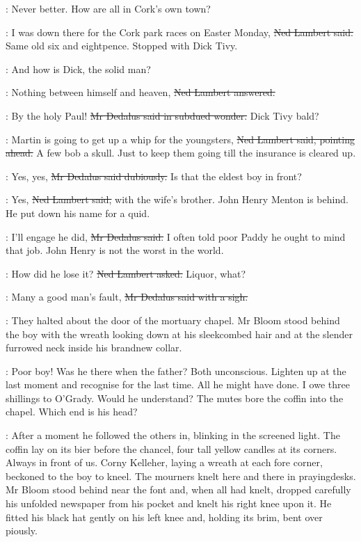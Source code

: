 \simon:
Never better.
How are all in Cork's own town?

\lambert:
I was down there for the Cork park races on Easter Monday,
\sout{Ned Lambert said.}
Same old six and eightpence.
Stopped with Dick Tivy.

\simon:
And how is Dick, the solid man?

\lambert:
Nothing between himself and heaven,
\sout{Ned Lambert answered.}

\simon:
By the holy Paul!
\sout{Mr Dedalus said in subdued wonder.}
Dick Tivy bald?

\lambert:
Martin is going to get up a whip for the youngsters,
\sout{Ned Lambert said, pointing ahead.}
A few bob a skull.
Just to keep them going till the insurance is cleared up.

\simon:
Yes, yes,
\sout{Mr Dedalus said dubiously.}
Is that the eldest boy in front?

\lambert:
Yes,
\sout{Ned Lambert said,}
with the wife's brother.
John Henry Menton is behind.
He put down his name for a quid.

\simon:
I'll engage he did,
\sout{Mr Dedalus said.}
I often told poor Paddy he ought to mind that job.
John Henry is not the worst in the world.

\lambert:
How did he lose it?
\sout{Ned Lambert asked.}
Liquor, what?

\simon:
Many a good man's fault,
\sout{Mr Dedalus said with a sigh.}

:
They halted about the door of the mortuary chapel.
Mr Bloom stood behind the boy with the wreath
looking down at his sleekcombed hair and
at the slender furrowed neck inside his brandnew collar.

\BloomInt:
Poor boy!
Was he there when the father?
Both unconscious.
Lighten up at the last moment and recognise for the last time.
All he might have done.
I owe three shillings to O'Grady.
Would he understand?
The mutes bore the coffin into the chapel.
Which end is his head?

:
After a moment he followed the others in,
blinking in the screened light.
The coffin lay on its bier before the chancel,
four tall yellow candles at its corners.
Always in front of us.
Corny Kelleher, laying a wreath at each fore corner,
beckoned to the boy to kneel.
The mourners knelt here and there in prayingdesks.
Mr Bloom stood behind near the font
and, when all had knelt,
dropped carefully his unfolded newspaper from his pocket
and knelt his right knee upon it.
He fitted his black hat gently on his left knee
and, holding its brim, bent over piously.

